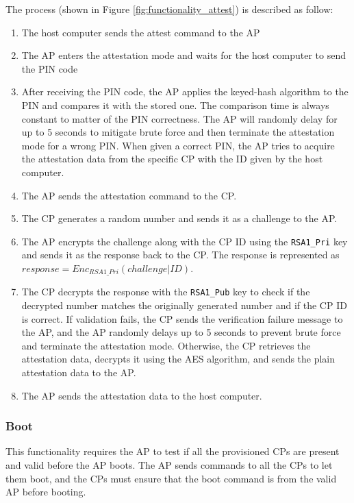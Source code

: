 \documentclass[11pt,oneside,onecolumn,letterpaper]{article}
\newcounter{alg}
\begin{document}
	The process (shown in Figure \ref{fig:functionality_attest}) is described as follow:
	\begin{enumerate}
		\item The host computer sends the attest command to the AP
		\item The AP enters the attestation mode and waits for the host computer to send the PIN code
		\item After receiving the PIN code,
		the AP applies the keyed-hash algorithm to the PIN and compares it with the stored one.
		The comparison time is always constant to matter of the PIN correctness.
		The AP will randomly delay for up to 5 seconds to mitigate brute force and then terminate the attestation mode for a wrong PIN.
		When given a correct PIN,
		the AP tries to acquire the attestation data from the specific CP with the ID given by the host computer.
		\item The AP sends the attestation command to the CP.
		\item The CP generates a random number and sends it as a challenge to the AP.
		\item The AP encrypts the challenge along with the CP ID using the \texttt{RSA1\_Pri} key and sends it as the response back to the CP.
		The response is represented as $ response = Enc_{RSA1\_Pri}(challenge|ID) $.
		\item The CP decrypts the response with the \texttt{RSA1\_Pub} key to check if the decrypted number matches the originally generated number and if the CP ID is correct.
		If validation fails,
		the CP sends the verification failure message to the AP,
		and the AP randomly delays up to 5 seconds to prevent brute force and terminate the attestation mode.
		Otherwise,
		the CP retrieves the attestation data,
		decrypts it using the AES algorithm,
		and sends the plain attestation data to the AP.
		\item The AP sends the attestation data to the host computer.
	\end{enumerate}
	
	\subsubsection{Boot}
	This functionality requires the AP to test if all the provisioned CPs are present and valid before the AP boots.
	The AP sends commands to all the CPs to let them boot,
	and the CPs must ensure that the boot command is from the valid AP before booting.
	
\end{document}

